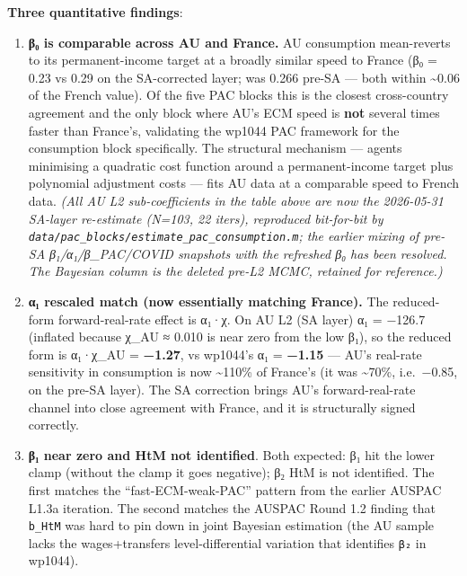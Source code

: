 \documentclass[
]{article}
\providecommand{\tightlist}{%
  \setlength{\itemsep}{0pt}\setlength{\parskip}{0pt}}
\begin{document}
\textbf{Three quantitative findings}:

\begin{enumerate}
\def\labelenumi{\arabic{enumi}.}
\tightlist
\item
  \textbf{β₀ is comparable across AU and France.} AU consumption
  mean-reverts to its permanent-income target at a broadly similar speed
  to France (β₀ = 0.23 vs 0.29 on the SA-corrected layer; was 0.266
  pre-SA --- both within \textasciitilde0.06 of the French value). Of
  the five PAC blocks this is the closest cross-country agreement and
  the only block where AU's ECM speed is \textbf{not} several times
  faster than France's, validating the wp1044 PAC framework for the
  consumption block specifically. The structural mechanism --- agents
  minimising a quadratic cost function around a permanent-income target
  plus polynomial adjustment costs --- fits AU data at a comparable
  speed to French data. \emph{(All AU L2 sub-coefficients in the table
  above are now the 2026-05-31 SA-layer re-estimate (N=103, 22 iters),
  reproduced bit-for-bit by
  \texttt{data/pac\_blocks/estimate\_pac\_consumption.m}; the earlier
  mixing of pre-SA β₁/α₁/β\_PAC/COVID snapshots with the refreshed β₀
  has been resolved. The Bayesian column is the deleted pre-L2 MCMC,
  retained for reference.)}
\item
  \textbf{α₁ rescaled match (now essentially matching France).} The
  reduced-form forward-real-rate effect is α₁·χ. On AU L2 (SA layer) α₁
  = −126.7 (inflated because χ\_AU ≈ 0.010 is near zero from the low
  β₁), so the reduced form is α₁·χ\_AU = \textbf{−1.27}, vs wp1044's α₁
  = \textbf{−1.15} --- AU's real-rate sensitivity in consumption is now
  \textasciitilde110\% of France's (it was \textasciitilde70\%,
  i.e.~−0.85, on the pre-SA layer). The SA correction brings AU's
  forward-real-rate channel into close agreement with France, and it is
  structurally signed correctly.
\item
  \textbf{β₁ near zero and HtM not identified}. Both expected: β₁ hit
  the lower clamp (without the clamp it goes negative); β₂ HtM is not
  identified. The first matches the ``fast-ECM-weak-PAC'' pattern from
  the earlier AUSPAC L1.3a iteration. The second matches the AUSPAC
  Round 1.2 finding that \texttt{b\_HtM} was hard to pin down in joint
  Bayesian estimation (the AU sample lacks the wages+transfers
  level-differential variation that identifies \texttt{β₂} in wp1044).
\end{enumerate}
\end{document}
